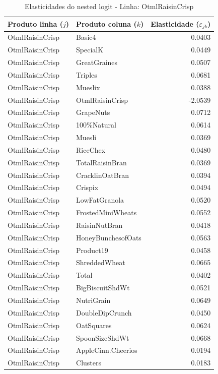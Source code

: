 \begingroup
\begin{table}[H]
\centering
\caption{Elasticidades do nested logit - Linha: OtmlRaisinCrisp}
\label{tab:elas-nested-otmlraisincrisp}
\small
\begin{tabular}{llr}
\toprule
Produto linha ($j$) & Produto coluna ($k$) & Elasticidade ($\varepsilon_{jk}$) \\
\midrule
OtmlRaisinCrisp & Basic4 & 0.0403 \\
OtmlRaisinCrisp & SpecialK & 0.0449 \\
OtmlRaisinCrisp & GreatGraines & 0.0507 \\
OtmlRaisinCrisp & Triples & 0.0681 \\
OtmlRaisinCrisp & Mueslix & 0.0388 \\
OtmlRaisinCrisp & OtmlRaisinCrisp & -2.0539 \\
OtmlRaisinCrisp & GrapeNuts & 0.0712 \\
OtmlRaisinCrisp & 100\%Natural & 0.0614 \\
OtmlRaisinCrisp & Muesli & 0.0369 \\
OtmlRaisinCrisp & RiceChex & 0.0480 \\
OtmlRaisinCrisp & TotalRaisinBran & 0.0369 \\
OtmlRaisinCrisp & CracklinOatBran & 0.0394 \\
OtmlRaisinCrisp & Crispix & 0.0494 \\
OtmlRaisinCrisp & LowFatGranola & 0.0520 \\
OtmlRaisinCrisp & FrostedMiniWheats & 0.0552 \\
OtmlRaisinCrisp & RaisinNutBran & 0.0418 \\
OtmlRaisinCrisp & HoneyBunchesofOats & 0.0563 \\
OtmlRaisinCrisp & Product19 & 0.0458 \\
OtmlRaisinCrisp & ShreddedWheat & 0.0665 \\
OtmlRaisinCrisp & Total & 0.0402 \\
OtmlRaisinCrisp & BigBiscuitShdWt & 0.0521 \\
OtmlRaisinCrisp & NutriGrain & 0.0649 \\
OtmlRaisinCrisp & DoubleDipCrunch & 0.0450 \\
OtmlRaisinCrisp & OatSquares & 0.0624 \\
OtmlRaisinCrisp & SpoonSizeShdWt & 0.0668 \\
OtmlRaisinCrisp & AppleCinn.Cheerios & 0.0194 \\
OtmlRaisinCrisp & Clusters & 0.0183 \\

\end{tabular}
\end{table}
